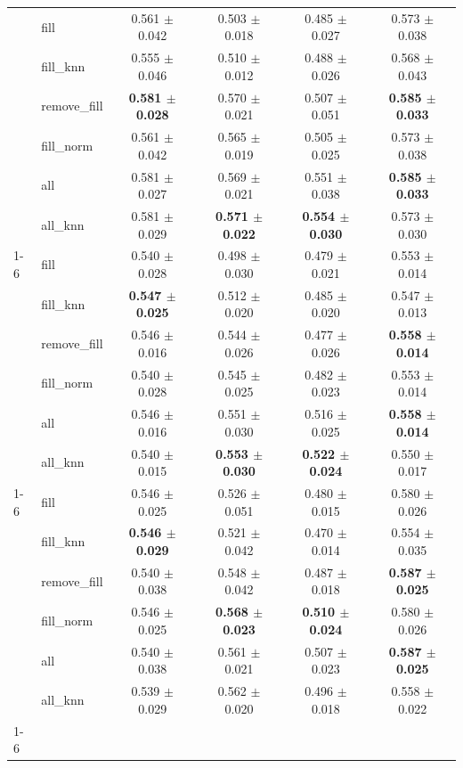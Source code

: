 \begin{table}[htbp]
\begin{tabular}{llcccc}
{{\cline{1-6}
\multirow[t]{7}{*}{30%
 & fill & 0.561 $\pm$ 0.042 & 0.503 $\pm$ 0.018 & 0.485 $\pm$ 0.027 & 0.573 $\pm$ 0.038 \\
 & fill_knn & 0.555 $\pm$ 0.046 & 0.510 $\pm$ 0.012 & 0.488 $\pm$ 0.026 & 0.568 $\pm$ 0.043 \\
 & remove_fill & \textbf{0.581 $\pm$ 0.028} & 0.570 $\pm$ 0.021 & 0.507 $\pm$ 0.051 & \textbf{0.585 $\pm$ 0.033} \\
 & fill_norm & 0.561 $\pm$ 0.042 & 0.565 $\pm$ 0.019 & 0.505 $\pm$ 0.025 & 0.573 $\pm$ 0.038 \\
 & all & 0.581 $\pm$ 0.027 & 0.569 $\pm$ 0.021 & 0.551 $\pm$ 0.038 & \textbf{0.585 $\pm$ 0.033} \\
 & all_knn & 0.581 $\pm$ 0.029 & \textbf{0.571 $\pm$ 0.022} & \textbf{0.554 $\pm$ 0.030} & 0.573 $\pm$ 0.030 \\
\cline{1-6}
\multirow[t]{7}{*}{40%
 & fill & 0.540 $\pm$ 0.028 & 0.498 $\pm$ 0.030 & 0.479 $\pm$ 0.021 & 0.553 $\pm$ 0.014 \\
 & fill_knn & \textbf{0.547 $\pm$ 0.025} & 0.512 $\pm$ 0.020 & 0.485 $\pm$ 0.020 & 0.547 $\pm$ 0.013 \\
 & remove_fill & 0.546 $\pm$ 0.016 & 0.544 $\pm$ 0.026 & 0.477 $\pm$ 0.026 & \textbf{0.558 $\pm$ 0.014} \\
 & fill_norm & 0.540 $\pm$ 0.028 & 0.545 $\pm$ 0.025 & 0.482 $\pm$ 0.023 & 0.553 $\pm$ 0.014 \\
 & all & 0.546 $\pm$ 0.016 & 0.551 $\pm$ 0.030 & 0.516 $\pm$ 0.025 & \textbf{0.558 $\pm$ 0.014} \\
 & all_knn & 0.540 $\pm$ 0.015 & \textbf{0.553 $\pm$ 0.030} & \textbf{0.522 $\pm$ 0.024} & 0.550 $\pm$ 0.017 \\
\cline{1-6}
\multirow[t]{7}{*}{50%
 & fill & 0.546 $\pm$ 0.025 & 0.526 $\pm$ 0.051 & 0.480 $\pm$ 0.015 & 0.580 $\pm$ 0.026 \\
 & fill_knn & \textbf{0.546 $\pm$ 0.029} & 0.521 $\pm$ 0.042 & 0.470 $\pm$ 0.014 & 0.554 $\pm$ 0.035 \\
 & remove_fill & 0.540 $\pm$ 0.038 & 0.548 $\pm$ 0.042 & 0.487 $\pm$ 0.018 & \textbf{0.587 $\pm$ 0.025} \\
 & fill_norm & 0.546 $\pm$ 0.025 & \textbf{0.568 $\pm$ 0.023} & \textbf{0.510 $\pm$ 0.024} & 0.580 $\pm$ 0.026 \\
 & all & 0.540 $\pm$ 0.038 & 0.561 $\pm$ 0.021 & 0.507 $\pm$ 0.023 & \textbf{0.587 $\pm$ 0.025} \\
 & all_knn & 0.539 $\pm$ 0.029 & 0.562 $\pm$ 0.020 & 0.496 $\pm$ 0.018 & 0.558 $\pm$ 0.022 \\
\cline{1-6}
\bottomrule
\end{tabular}
\end{table}
